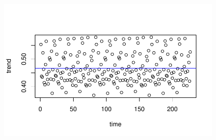 \documentclass[12pt,a4paper]{book}
\begin{document}
{\begin{table}
\end{table}

\begin{Shaded}
\begin{Highlighting}[]
\NormalTok{(}\SpecialCharTok{$}\NormalTok{coefficients[}\NormalTok{,}\NormalTok{], }\SpecialCharTok{$}\NormalTok{coefficients[}\NormalTok{,}\NormalTok{], } \NormalTok{)}
\end{Highlighting}
\end{Shaded}

\begin{figure}[H]

{\centering \includegraphics{Quarto_files/figure-pdf/unnamed-chunk-13-1.pdf}

}

\end{figure}

\begin{Shaded}
\begin{Highlighting}[]
\OtherTok{\textless{}{-}}\SpecialCharTok{::}\NormalTok{(} \NormalTok{, }
\end{Highlighting}
\end{Shaded}

\begin{figure}[H]


\end{figure}}
\end{document}
